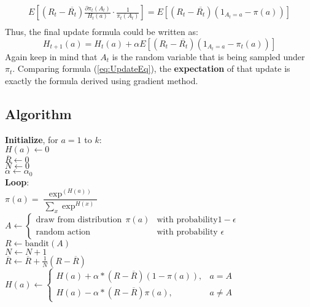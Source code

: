 \documentclass{article}
\begin{document}
\begin{equation}
    \begin{aligned}
    E[(R_t - \overline{R_t})\frac{\partial \pi_t(A_t)}{H_t(a)}\cdot\frac{1}{\pi_t(A_t)}] = E[(R_t - \overline{R_t})
    (1_{A_t=a}-\pi(a))]\\
    \end{aligned}
\end{equation}
Thus, the final update formula could be written as:
\begin{equation}
    H_{t+1}(a) = H_t(a) + \alpha E[(R_t-\overline{R_t})(1_{A_t=a}-\pi_t(a))]
\end{equation}
Again keep in mind that $A_t$ is the random variable that is being sampled under $\pi_t$.
Comparing formula (\ref{eq:UpdateEq}), the \textbf{expectation} of that update is exactly the formula derived using 
gradient method.
\subsection{Algorithm}
\begin{tcolorbox}[colback=white, colframe=black, title=Gradient Bandit Algorithm]
    \textbf{Initialize}, for $a = 1$ to $k$: \\
    \hspace*{0.5cm} $H(a) \leftarrow 0$ \\
    \hspace*{0.5cm} $\overline{R} \leftarrow 0$ \\
    \hspace*{0.5cm} $N \leftarrow 0$ \\
    \hspace*{0.5cm} $\alpha \leftarrow \alpha_0$ \\
    \textbf{Loop}: \\
    \hspace*{0.5cm} $\pi(a) = \dfrac{\exp^{(H(a))}}{\sum_x \exp^{H(x)}}$\\
    \hspace*{0.5cm} $A \leftarrow \begin{cases} 
    \text{draw from distribution} ~~\pi(a) & \text{with probability} 1-\epsilon \\
    \text{random action} & \text{with probability } \epsilon 
    \end{cases}$ \\
    \hspace*{0.5cm} $R \leftarrow \text{bandit}(A)$ \\
    \hspace*{0.5cm} $N \leftarrow N + 1$ \\
    \hspace*{0.5cm} $\overline{R} \leftarrow \overline{R} + \frac{1}{N}(R - \overline{R})$ \\
    \hspace*{0.5cm} $H(a) \leftarrow \begin{cases} H(a) + \alpha*(R-\overline{R})(1-\pi(a)), & a=A \\
                                                   H(a) - \alpha*(R-\overline{R})\pi(a) , & a \neq A 
                                                \end{cases} $
\end{tcolorbox}
\end{document}
